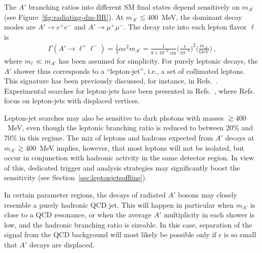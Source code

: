 The $A'$ branching ratios into different SM final states depend sensitively on $m_{A'}$ (see Figure~\ref{fig:radiating-dm-BR}). At $m_{A'} \lesssim 400$~MeV, the dominant decay modes are $A' \to e^+e^-$ and $A' \to \mu^+ \mu^-$. The decay rate into each lepton flavor $\ell$ is
\begin{align}
  \Gamma(A' \to \ell^+\ell^-) =
    \frac{1}{3} \alpha \epsilon^2 m_{A'}
    = \frac{1}{8 \times 10^{-6}\,\text{cm}}
      \bigg( \frac{\epsilon}{10^{-3}} \bigg)^2
      \bigg( \frac{m_{A'}}{\text{GeV}} \bigg) \,,
\end{align}
where $m_\ell \ll m_{A'}$ has been assumed for simplicity. For purely leptonic decays, the $A'$ shower thus corresponds to a ``lepton-jet'', i.e., a set of collimated leptons. This signature has been previously discussed, for instance, in Refs.~\cite{ArkaniHamed:2008qp,Cheung:2009su, Katz:2009qq, Bai:2009it, Baumgart:2009tn, Chan:2011aa,Falkowski:2010gv, Curtin:2013fra, Gupta:2015lfa, Autran:2015mfa}. Experimental searches for lepton-jets have been presented in Refs.~\cite{Aad:2014yea, Aad:2015sms, ATLAS-CONF-2016-042, Khachatryan:2015wka}, where Refs.~\cite{Aad:2014yea, ATLAS-CONF-2016-042} focus on lepton-jets with displaced vertices.

Lepton-jet searches may also be sensitive to dark photons with masses $\gtrsim 400$~MeV, even though the leptonic branching ratio is reduced to between 20\% and 70\% in this regime. The mix of leptons and hadrons expected from $A'$ decays at $m_{A'} \gtrsim 400$~MeV implies, however, that most leptons will not be isolated, but occur in conjunction with hadronic activity in the same detector region. In view of this, dedicated trigger and analysis strategies may significantly boost the sensitivity (see Section~\ref{sec:leptonjetsoffline}).

In certain parameter regions, the decays of radiated $A'$ bosons may closely resemble a purely hadronic QCD jet. This will happen in particular when $m_{A'}$ is close to a QCD resonance, or when the average $A'$ multiplicity in each shower is low, and the hadronic branching ratio is sizeable. In this case, separation of the signal from the QCD background will most likely be possible only if $\epsilon$ is so small that $A'$ decays are displaced.

